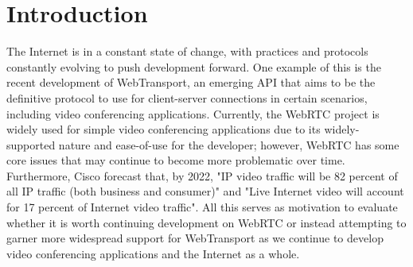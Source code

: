 \chapter{Introduction}




%

The Internet is in a constant state of change, with practices and protocols constantly evolving to push development forward. One example of this is the recent development of WebTransport, an emerging API that aims to be the definitive protocol to use for client-server connections in certain scenarios, including video conferencing applications. 
Currently, the WebRTC project is widely used for simple video conferencing applications due to its widely-supported nature and ease-of-use for the developer; however, WebRTC has some core issues that may continue to become more problematic over time. 
Furthermore, Cisco forecast that, by 2022, "IP video traffic will be 82 percent of all IP traffic (both business and consumer)" and "Live Internet video will account for 17 percent of Internet video traffic". \cite{cisco_report} All this serves as motivation to evaluate whether it is worth continuing development on WebRTC or instead attempting to garner more widespread support for WebTransport as we continue to develop video conferencing applications and the Internet as a whole.




